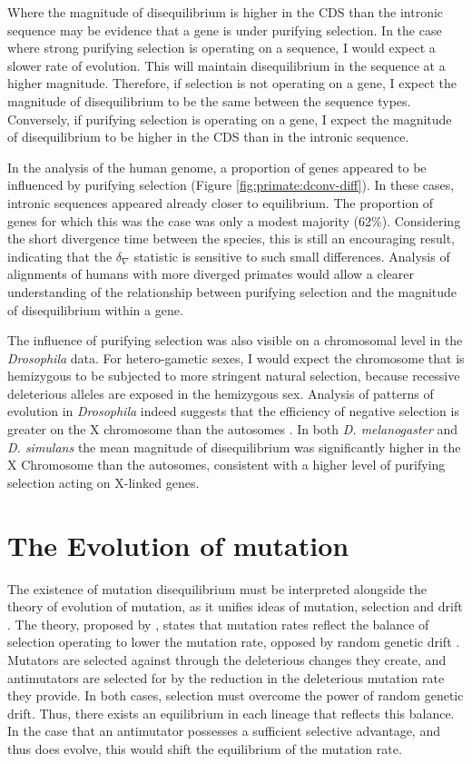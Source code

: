 Where the magnitude of disequilibrium is higher in the CDS than the intronic sequence may be evidence that a gene is under purifying selection. In the case where strong purifying selection is operating on a sequence, I would expect a slower rate of evolution. This will maintain disequilibrium in the sequence at a higher magnitude.  Therefore, if selection is not operating on a gene, I expect the magnitude of disequilibrium to be the same between the sequence types. Conversely, if purifying selection is operating on a gene, I expect the magnitude of disequilibrium to be higher in the CDS than in the intronic sequence.  

In the analysis of the human genome, a proportion of genes appeared to be influenced by purifying selection (Figure \ref{fig:primate:dconv-diff}). In these cases, intronic sequences appeared already closer to equilibrium. The proportion of genes for which this was the case was only a modest majority (62\%). Considering the short divergence time between the species, this is still an encouraging result, indicating that the $\delta_\nabla$ statistic is sensitive to such small differences. Analysis of alignments of humans with more diverged primates would allow a clearer understanding of the relationship between purifying selection and the magnitude of disequilibrium within a gene. 

The influence of purifying selection was also visible on a chromosomal level in the \textit{Drosophila} data. For hetero-gametic sexes, I would expect the chromosome that is hemizygous to be subjected to more stringent natural selection, because recessive deleterious alleles are exposed in the hemizygous sex. Analysis of patterns of evolution in \textit{Drosophila} indeed suggests that the efficiency of negative selection is greater on the X chromosome than the autosomes \citep{Singh2008ContrastingDrosophila}. In both \textit{D. melanogaster} and \textit{D. simulans} the mean magnitude of disequilibrium was significantly higher in the X Chromosome than the autosomes, consistent with a higher level of purifying selection acting on X-linked genes. 

\section{The Evolution of mutation}

The existence of mutation disequilibrium must be interpreted alongside the theory of evolution of mutation, as it unifies ideas of mutation, selection and drift \citep{Lynch2008TheEvolution, Lynch2010EvolutionRate}. The theory, proposed by \cite{Lynch2008TheEvolution}, states that mutation rates reflect the balance of selection operating to lower the mutation rate, opposed by random genetic drift \citep{Lynch2010EvolutionRate}. Mutators are selected against through the deleterious changes they create, and antimutators are selected for by the reduction in the deleterious mutation rate they provide. In both cases, selection must overcome the power of random genetic drift. Thus, there exists an equilibrium in each lineage that reflects this balance. In the case that an antimutator possesses a sufficient selective advantage, and thus does evolve, this would shift the equilibrium of the mutation rate. 

